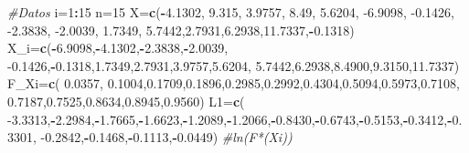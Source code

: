 \documentclass[
  a4paper,
  oneside,
  openany]{book}
\newenvironment{Shaded}{\begin{snugshade}}{\end{snugshade}}
\newcommand{\CommentTok}[1]{\textcolor[rgb]{0.56,0.35,0.01}{\textit{#1}}}
\newcommand{\DecValTok}[1]{\textcolor[rgb]{0.00,0.00,0.81}{#1}}
\newcommand{\FloatTok}[1]{\textcolor[rgb]{0.00,0.00,0.81}{#1}}
\newcommand{\KeywordTok}[1]{\textcolor[rgb]{0.13,0.29,0.53}{\textbf{#1}}}
\newcommand{\NormalTok}[1]{#1}
\newcommand{\OperatorTok}[1]{\textcolor[rgb]{0.81,0.36,0.00}{\textbf{#1}}}
\begin{document}
\begin{Shaded}
\begin{Highlighting}[]
\CommentTok{\#Datos}
\NormalTok{i=}\DecValTok{1}\OperatorTok{:}\DecValTok{15}
\NormalTok{n=}\DecValTok{15}
\NormalTok{X=}\KeywordTok{c}\NormalTok{(}\OperatorTok{{-}}\FloatTok{4.1302}\NormalTok{, }\FloatTok{9.315}\NormalTok{, }\FloatTok{3.9757}\NormalTok{, }\FloatTok{8.49}\NormalTok{, }\FloatTok{5.6204}\NormalTok{, }\FloatTok{{-}6.9098}\NormalTok{, }\FloatTok{{-}0.1426}\NormalTok{, }\FloatTok{{-}2.3838}\NormalTok{,}
                            \FloatTok{{-}2.0039}\NormalTok{, }\FloatTok{1.7349}\NormalTok{, }\FloatTok{5.7442}\NormalTok{,}\FloatTok{2.7931}\NormalTok{,}\FloatTok{6.2938}\NormalTok{,}\FloatTok{11.7337}\NormalTok{,}\OperatorTok{{-}}\FloatTok{0.1318}\NormalTok{)}
\NormalTok{X\_i=}\KeywordTok{c}\NormalTok{(}\OperatorTok{{-}}\FloatTok{6.9098}\NormalTok{,}\OperatorTok{{-}}\FloatTok{4.1302}\NormalTok{,}\OperatorTok{{-}}\FloatTok{2.3838}\NormalTok{,}\OperatorTok{{-}}\FloatTok{2.0039}\NormalTok{, }\FloatTok{{-}0.1426}\NormalTok{,}\OperatorTok{{-}}\FloatTok{0.1318}\NormalTok{,}\FloatTok{1.7349}\NormalTok{,}\FloatTok{2.7931}\NormalTok{,}\FloatTok{3.9757}\NormalTok{,}\FloatTok{5.6204}\NormalTok{,}
      \FloatTok{5.7442}\NormalTok{,}\FloatTok{6.2938}\NormalTok{,}\FloatTok{8.4900}\NormalTok{,}\FloatTok{9.3150}\NormalTok{,}\FloatTok{11.7337}\NormalTok{)}
\NormalTok{F\_Xi=}\KeywordTok{c}\NormalTok{( }\FloatTok{0.0357}\NormalTok{, }\FloatTok{0.1004}\NormalTok{,}\FloatTok{0.1709}\NormalTok{,}\FloatTok{0.1896}\NormalTok{,}\FloatTok{0.2985}\NormalTok{,}\FloatTok{0.2992}\NormalTok{,}\FloatTok{0.4304}\NormalTok{,}\FloatTok{0.5094}\NormalTok{,}\FloatTok{0.5973}\NormalTok{,}\FloatTok{0.7108}\NormalTok{,}
        \FloatTok{0.7187}\NormalTok{,}\FloatTok{0.7525}\NormalTok{,}\FloatTok{0.8634}\NormalTok{,}\FloatTok{0.8945}\NormalTok{,}\FloatTok{0.9560}\NormalTok{)}
\NormalTok{L1=}\KeywordTok{c}\NormalTok{( }\FloatTok{{-}3.3313}\NormalTok{,}\OperatorTok{{-}}\FloatTok{2.2984}\NormalTok{,}\OperatorTok{{-}}\FloatTok{1.7665}\NormalTok{,}\OperatorTok{{-}}\FloatTok{1.6623}\NormalTok{,}\OperatorTok{{-}}\FloatTok{1.2089}\NormalTok{,}\OperatorTok{{-}}\FloatTok{1.2066}\NormalTok{,}\OperatorTok{{-}}\FloatTok{0.8430}\NormalTok{,}\OperatorTok{{-}}\FloatTok{0.6743}\NormalTok{,}\OperatorTok{{-}}\FloatTok{0.5153}\NormalTok{,}\OperatorTok{{-}}\FloatTok{0.3412}\NormalTok{,}\OperatorTok{{-}}\FloatTok{0.3301}\NormalTok{,}
      \FloatTok{{-}0.2842}\NormalTok{,}\OperatorTok{{-}}\FloatTok{0.1468}\NormalTok{,}\OperatorTok{{-}}\FloatTok{0.1113}\NormalTok{,}\OperatorTok{{-}}\FloatTok{0.0449}\NormalTok{)    }\CommentTok{\#ln(F*(Xi))}

\end{Highlighting}
\end{Shaded}
\end{document}
